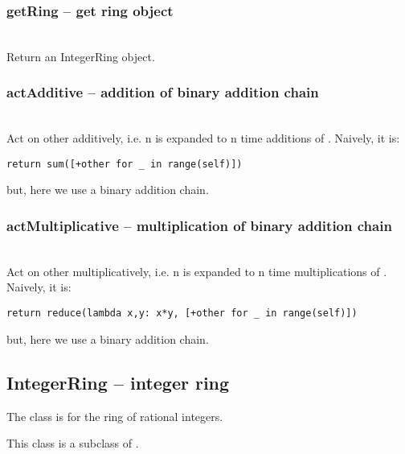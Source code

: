   \subsubsection{getRing -- get ring object}
   \\
   \spacing
   \quad Return an IntegerRing object.
%
  \subsubsection{actAdditive -- addition of binary addition chain}
   \\
   \spacing
   \quad Act on other additively, i.e. n is expanded to n time additions of . Naively, it is:

   \verb|return sum([+other for _ in range(self)])|

   but, here we use a binary addition chain.\\
   \spacing
%
  \subsubsection{actMultiplicative -- multiplication of binary addition chain}
   \\
   \spacing
   \quad Act on other multiplicatively, i.e. n is expanded to n time multiplications of . Naively, it is:

\verb|return reduce(lambda x,y: x*y, [+other for _ in range(self)])|

   but, here we use a binary addition chain.
   \spacing
\C
 \subsection{IntegerRing -- integer ring}
 The class is for the ring of rational integers.

 This class is a subclass of .


